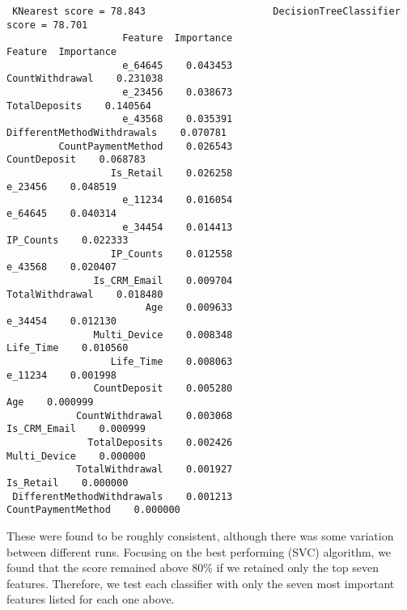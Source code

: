 \documentclass[11pt]{article} %
\begin{document}
{\begin{verbatim}
 KNearest score = 78.843                      DecisionTreeClassifier score = 78.701  
                    Feature  Importance                         Feature  Importance
                    e_64645    0.043453                 CountWithdrawal    0.231038
                    e_23456    0.038673                   TotalDeposits    0.140564
                    e_43568    0.035391      DifferentMethodWithdrawals    0.070781
         CountPaymentMethod    0.026543                    CountDeposit    0.068783
                  Is_Retail    0.026258                         e_23456    0.048519
                    e_11234    0.016054                         e_64645    0.040314
                    e_34454    0.014413                       IP_Counts    0.022333
                  IP_Counts    0.012558                         e_43568    0.020407
               Is_CRM_Email    0.009704                 TotalWithdrawal    0.018480
                        Age    0.009633                         e_34454    0.012130
               Multi_Device    0.008348                       Life_Time    0.010560
                  Life_Time    0.008063                         e_11234    0.001998
               CountDeposit    0.005280                             Age    0.000999
            CountWithdrawal    0.003068                    Is_CRM_Email    0.000999
              TotalDeposits    0.002426                    Multi_Device    0.000000
            TotalWithdrawal    0.001927                       Is_Retail    0.000000
 DifferentMethodWithdrawals    0.001213              CountPaymentMethod    0.000000
\end{verbatim}
\normalsize
}
These were found to be roughly consistent, although there was some variation between different runs.
Focusing on the best performing (SVC) algorithm, we found that the score remained
above 80\% if we retained only the top seven features. Therefore, we test each classifier with only
the seven most important features listed for each one above.
\end{document}
